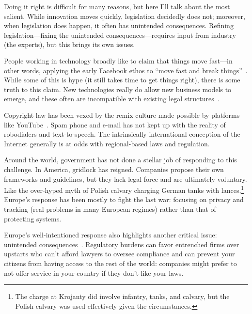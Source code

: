 Doing it right is difficult for many reasons, but here I'll talk about
the most salient.  While innovation moves quickly, legislation
decidedly does not; moreover, when legislation does happen, it often
has unintended consequences.  Refining legislation---fixing the
unintended consequences---requires input from industry (the experts),
but this brings its own issues.

People working in technology broadly like to claim that things move
fast---in other words, applying the early Facebook ethos to ``move fast and break
  things''~\citep{vardi-18}.  While some of this is hype (it still takes time to get
things right), there is some truth to this claim.  New technologies
really do allow new business models to emerge, and these often are
incompatible with existing legal structures~\citep{nieuwland-18}.

Copyright law has been vexed by the remix culture made possible by
platforms like YouTube~\citep{lessig-08}.  Spam phone and e-mail has not kept up with
the reality of robodialers and text-to-speech.  The intrinsically
international conception of the Internet generally is at odds with
regional-based laws and regulation.


Around the world, government has not done a stellar job of responding
to this challenge.  In America, gridlock has reigned.  Companies
propose their own frameworks and guidelines, but they lack legal force
and are ultimately voluntary.  Like the over-hyped myth of Polish
calvary charging German tanks with lances,\footnote{The charge at
  Krojanty did involve infantry, tanks, and calvary, but the Polish
  calvary was used effectively given the circumstances.  } Europe's response has been mostly to
fight the last war: focusing on privacy and tracking (real problems in
many European regimes) rather than that of protecting systems.

Europe's well-intentioned  response also highlights another
critical issue: unintended consequences~\citep{goodman-17}.  Regulatory burdens can favor
entrenched firms over upstarts who can't afford lawyers to oversee
compliance and can prevent your citizens from having access to the
rest of the world: companies might prefer to not offer service in
your country if they don't like your laws.

